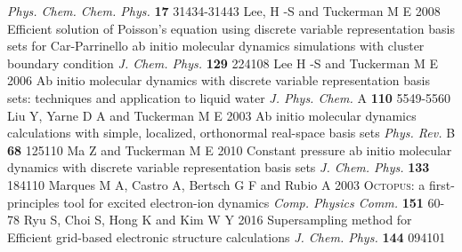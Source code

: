 \begin{thebibliography}{9}
\textit{Phys. Chem. Chem. Phys.} \textbf{17} 31434-31443
%
 Lee, H -S and Tuckerman M E 2008
Efficient solution of Poisson's equation using discrete variable
representation basis sets for Car-Parrinello ab initio molecular
dynamics simulations with cluster boundary condition
\textit{J. Chem. Phys.} \textbf{129} 224108
%
 Lee H -S and Tuckerman M E 2006
Ab initio molecular dynamics with discrete variable representation basis sets:
techniques and application to liquid water
\textit{J. Phys. Chem.} A \textbf{110} 5549-5560
%
 Liu Y, Yarne D A and Tuckerman M E 2003
Ab initio molecular dynamics calculations with simple, localized, orthonormal
real-space basis sets
\textit{Phys. Rev.} B \textbf{68} 125110
%
 Ma Z and Tuckerman M E 2010
Constant pressure ab initio molecular dynamics with discrete variable representation basis sets
\textit{J. Chem. Phys.} \textbf{133} 184110
%
 Marques M A, Castro A, Bertsch G F and Rubio A 2003
\textsc{Octopus}: a first-principles tool for excited electron-ion dynamics
\textit{Comp. Physics Comm.} \textbf{151} 60-78
%
 Ryu S, Choi S, Hong K and Kim W Y 2016
Supersampling method for Efficient grid-based electronic structure calculations
\textit{J. Chem. Phys.} \textbf{144} 094101
\end{thebibliography}
